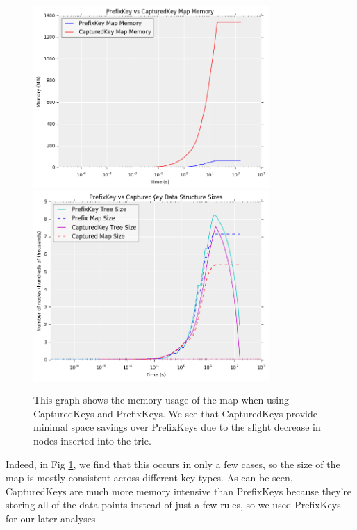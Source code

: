 \begin{figure}[t!]
	\begin{center}
	\includegraphics[width=0.8\textwidth]{figs/prefix-captured_pmap_mem.png}
	\includegraphics[width=0.8\textwidth]{figs/prefix-captured_tree_size.png}
	\caption{This graph shows the memory usage of the map when using CapturedKeys and PrefixKeys. 
We see that CapturedKeys provide minimal space savings over PrefixKeys due to the slight decrease in nodes inserted into the trie.}
	\end{center}
\label{fig:prefix-captured}
\end{figure}
Indeed, in Fig \ref{fig:prefix-captured}, we find that this occurs in only a few cases, so the size of the map is mostly consistent across different key types.
As can be seen, CapturedKeys are much more memory intensive than PrefixKeys because they're storing all of the data points instead of just a few rules, so we used PrefixKeys for our later analyses.


